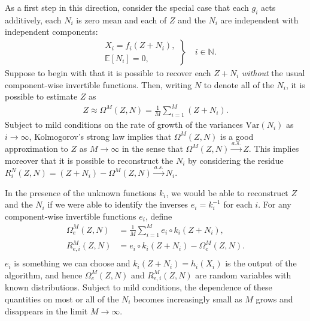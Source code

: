 As a first step in this direction, consider the special case that each ${g}_i$ acts additively, each $N_i$ is zero mean and each of $Z$ and the $N_i$ are independent with independent components:
%
\begin{align}
\left.
\begin{array}{ll}
&X_{i}={f}_{i}(Z + N_{i}), \\
&\mathbb{E}[N_i]= 0,
\end{array}
\right\rbrace \quad i \in \mathbb{N}.
\end{align}
%
Suppose to begin with that it is possible to recover each $Z + N_i$ \emph{without} the usual component-wise invertible functions. Then, writing $N$ to denote all of the $N_i$, it is possible to estimate $Z$ as
\begin{align*}
Z \approx \Omega^M(Z, N) = \frac{1}{M}\sum_{i=1}^M \left(Z + N_i\right).
\end{align*}
Subject to mild conditions on the rate of growth of the variances $\text{Var}(N_i)$ as $i\to\infty$, Kolmogorov's strong law implies that $\Omega^M(Z, N)$ is a good approximation to $Z$ as $M\to\infty$ in the sense that  $\Omega^M(Z, N) \overset{a.s.}{\longrightarrow} Z$.
This implies moreover that it is possible to reconstruct the $N_i$ by considering the residue $R^N_i(Z, N) = (Z + N_i) - \Omega^M(Z, N) \overset{a.s.}{\longrightarrow} N_i$.

In the presence of the unknown functions ${k}_i$, we would be able to reconstruct $Z$ and the $N_i$ if we were able to identify the inverses ${e}_i = {k}_i^{-1}$ for each $i$.
For any component-wise invertible functions ${e}_i$, define
\begin{align*}
\Omega_{e}^M(Z, N) &= \frac{1}{M} \sum_{i=1}^M {e}_i\circ {k}_i( Z + N_i), \\
R_{{e}, i}^M(Z, N) &= {e}_i\circ {k}_i( Z + N_i) - \Omega_{{e}}^M(Z, N).\\
\end{align*}
${e}_i$ is something we can choose and ${k}_i(Z+N_i) = {h}_i({X}_i)$ is the output of the algorithm, and hence $\Omega_{e}^M(Z, N)$ and $R_{{e}, i}^M(Z, N)$ are random variables with known distributions.
Subject to mild conditions, the dependence of these quantities on most or all of the $N_i$ becomes increasingly small as $M$ grows and disappears in the limit $M\to\infty$.

\medskip

